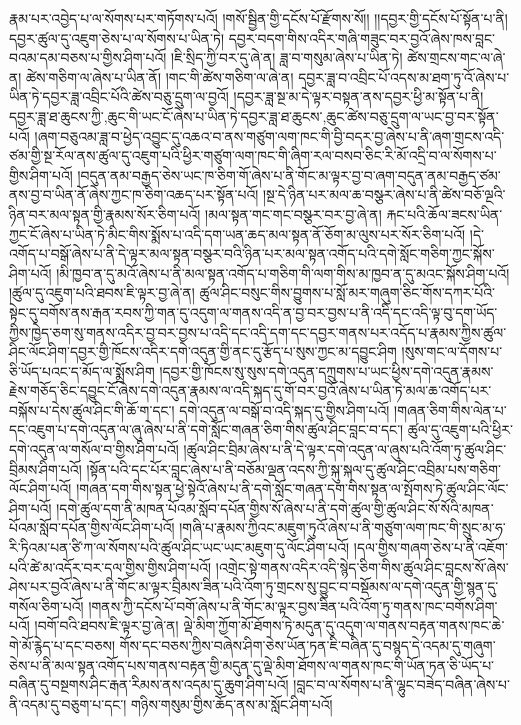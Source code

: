 རྣམ་པར་འབྱེད་པ་ལ་སོགས་པར་གཏོགས་པའོ། །གསོ་སྦྱིན་གྱི་དངོས་པོ་རྫོགས་སོ།། །།དབྱར་གྱི་དངོས་པོ་སྟོན་པ་ནི། དབྱར་ཚུལ་དུ་འཇུག་ཅེས་པ་ལ་སོགས་པ་ཡིན་ཏེ། དབྱར་བདག་གིས་འདིར་གཞི་གཟུང་བར་བྱའོ་ཞེས་ཁས་བླང་བའམ་དམ་བཅས་པ་གྱིས་ཤིག་པའོ། །ཇི་སྲིད་ཀྱི་བར་དུ་ཞེ་ན། ཟླ་བ་གསུམ་ཞེས་པ་ཡིན་ཏེ། ཚེས་གྲངས་གང་ལ་ཞེ་ན། ཚེས་གཅིག་ལ་ཞེས་པ་ཡིན་ནོ། །གང་གི་ཚེས་གཅིག་ལ་ཞེ་ན། དབྱར་ཟླ་བ་འབྲིང་པོ་འདས་མ་ཐག་ཏུ་འོ་ཞེས་པ་ཡིན་ཏེ་དབྱར་ཟླ་འབྲིང་པོའི་ཚེས་བཅུ་དྲུག་ལ་བྱའོ། །དབྱར་ཟླ་སྔ་མ་དེ་ལྟར་བསྟན་ནས་དབྱར་ཕྱི་མ་སྟོན་པ་ནི། དབྱར་ཟླ་ཐ་{ཆུངས་ཀྱི་,ཆུང་གི་}ཡང་ངོ་ཞེས་པ་ཡིན་ཏེ་དབྱར་ཟླ་ཐ་{ཆུངས་,ཆུང་}ཚེས་བཅུ་དྲུག་ལ་ཡང་བྱ་བར་སྟོན་པའོ། །ཞག་བཅུའམ་ཟླ་བ་ཕྱེད་འབྱུང་དུ་འཆའ་བ་ནས་གཙུག་ལག་ཁང་གི་བྱི་བདར་བྱ་ཞེས་པ་ནི་ཞག་གྲངས་འདི་ཙམ་གྱི་སྔ་རོལ་ནས་ཚུལ་དུ་འཇུག་པའི་ཕྱིར་གཙུག་ལག་ཁང་གི་ཞིག་རལ་བསབ་ཅིང་རི་མོ་འདྲི་བ་ལ་སོགས་པ་གྱིས་ཤིག་པའོ། །བདུན་ནམ་བརྒྱད་ཅེས་ཡང་ཁ་ཅིག་གོ་ཞེས་པ་ནི་གོང་མ་ལྟར་བྱ་བ་ཞག་བདུན་ནམ་བརྒྱད་ཙམ་ནས་བྱ་བ་ཡིན་ནོ་ཞེས་ཀྱང་ཁ་ཅིག་འཆད་པར་སྟོན་པའོ། །སྔ་དེ་ཉིན་པར་མལ་ཆ་བསྩར་ཞེས་པ་ནི་ཚེས་བཅོ་ལྔའི་ཉིན་བར་མལ་སྟན་གྱི་རྣམས་སོར་ཅིག་པའོ། །མལ་སྟན་གང་གང་བསྩར་བར་བྱ་ཞེ་ན། རྐང་པའི་ཆོལ་ཟངས་ཡིན་ཀྱང་ངོ་ཞེས་པ་ཡིན་ཏེ་མིང་གིས་སྨོས་པ་འདི་དག་ཡན་ཆད་མལ་སྟན་ནོ་ཅོག་མ་ལུས་པར་སོར་ཅིག་པའོ། །དེ་འགོད་པ་བསྒོ་ཞེས་པ་ནི་དེ་ལྟར་མལ་སྟན་བསྩར་བའི་ཉིན་པར་མལ་སྟན་འགོད་པའི་དགེ་སློང་གཅིག་ཀྱང་སྐོས་ཤིག་པའོ། །མི་ཁྱབ་ན་དུ་མའོ་ཞེས་པ་ནི་མལ་སྟན་འགོད་པ་གཅིག་གི་ལག་གིས་མ་ཁྱབ་ན་དུ་མའང་སྐོས་ཤིག་པའོ། །ཚུལ་དུ་འཇུག་པའི་ཐབས་ཇི་ལྟར་བྱ་ཞེ་ན། ཚུལ་ཤིང་བསུང་གིས་བྱུགས་པ་སློ་མར་གཞུག་ཅིང་གོས་དཀར་པོའི་སྟེང་དུ་བགོས་ནས་རྒན་རབས་ཀྱི་གན་དུ་འདུག་ལ་གནས་འདི་ན་བྱ་བར་བྱས་པ་ནི་འདི་དང་འདི་ལྟ་བུ་དག་ཡོད་ཀྱིས་ཁྱེད་ཅག་སུ་གནས་འདིར་བྱ་བར་བྱས་པ་འདི་དང་འདི་དག་དང་དབྱར་གནས་པར་འདོད་པ་རྣམས་ཀྱིས་ཚུལ་ཤིང་ལོང་ཤིག་དབྱར་གྱི་ཁོངས་འདིར་དགེ་འདུན་གྱི་ནང་དུ་རྩོད་པ་སུས་ཀྱང་མ་དབྱུང་ཤིག །སུས་གང་ལ་དོགས་པ་ཅི་ཡོད་པའང་ད་མོད་ལ་སྨྲོས་ཤིག །དབྱར་གྱི་ཁོངས་སུ་སུས་དགེ་འདུན་དཀྲུགས་པ་ཡང་ཕྱིས་དགེ་འདུན་རྣམས་རྗེས་གཅོད་ཅིང་དབྱུང་ངོ་ཞེས་དགེ་འདུན་རྣམས་ལ་འདི་སྐད་དུ་གོ་བར་བྱའོ་ཞེས་པ་ཡིན་ཏེ་མལ་ཆ་འགོད་པར་བསྐོས་པ་དེས་ཚུལ་ཤིང་གི་ཆོ་ག་དང་། དགེ་འདུན་ལ་བསྒོ་བ་འདི་སྐད་དུ་གྱིས་ཤིག་པའོ། །གཞན་ཅིག་གིས་ལེན་པ་དང་འཇུག་པ་དགེ་འདུན་ལ་ཞུ་ཞེས་པ་ནི་དགེ་སློང་གཞན་ཅིག་གིས་ཚུལ་ཤིང་བླང་བ་དང་། ཚུལ་དུ་འཇུག་པའི་ཕྱིར་དགེ་འདུན་ལ་གསོལ་བ་གྱིས་ཤིག་པའོ། །ཚུལ་ཤིང་བྲིམ་ཞེས་པ་ནི་དེ་ལྟར་དགེ་འདུན་ལ་ཞུས་པའི་འོག་ཏུ་ཚུལ་ཤིང་བྲིམས་ཤིག་པའོ། །སྟོན་པའི་དང་པོར་བླང་ཞེས་པ་ནི་བཅོམ་ལྡན་འདས་ཀྱི་སྐུ་སྐལ་དུ་ཚུལ་ཤིང་འབྲིམ་པས་གཅིག་ལོང་ཤིག་པའོ། །གཞན་དག་གིས་སྟན་ཕྱེ་སྟེའོ་ཞེས་པ་ནི་དགེ་སློང་གཞན་དག་གིས་སྟན་ལ་སྤོགས་ཏེ་ཚུལ་ཤིང་ལོང་ཤིག་པའོ། །དགེ་ཚུལ་དག་ནི་མཁན་པོའམ་སློབ་དཔོན་གྱིས་སོ་ཞེས་པ་ནི་དགེ་ཚུལ་གྱི་ཚུལ་ཤིང་སོ་སོའི་མཁན་པོའམ་སློབ་དཔོན་གྱིས་ལོང་ཤིག་པའོ། །གཞི་པ་རྣམས་ཀྱིའང་མཇུག་ཏུའོ་ཞེས་པ་ནི་གཙུག་ལག་ཁང་གི་སྲུང་མ་ཧ་རི་ཏིའམ་པན་ཙི་ཀ་ལ་སོགས་པའི་ཚུལ་ཤིང་ཡང་ཡང་མཇུག་དུ་ལོང་ཤིག་པའོ། །དལ་གྱིས་གཞག་ཅེས་པ་ནི་འཇོག་པའི་ཚེ་མ་འདོར་བར་དལ་གྱིས་གྱིས་ཤིག་པའོ། །འགྲེང་སྟེ་གནས་འདིར་འདི་སྙེད་ཅིག་གིས་ཚུལ་ཤིང་བླངས་སོ་ཞེས་ཤེས་པར་བྱའོ་ཞེས་པ་ནི་གོང་མ་ལྟར་བྲིམས་ཟིན་པའི་འོག་ཏུ་གྲངས་སུ་བྱུང་བ་བསྡོམས་ལ་དགེ་འདུན་གྱི་སྙན་དུ་གསོལ་ཅིག་པའོ། །གནས་ཀྱི་དངོས་པོ་བགོ་ཞེས་པ་ནི་གོང་མ་ལྟར་བྱས་ཟིན་པའི་འོག་ཏུ་གནས་ཁང་བགོས་ཤིག་པའོ། །བགོ་བའི་ཐབས་ཇི་ལྟར་བྱ་ཞེ་ན། ལྡེ་མིག་ཀྱོག་མོ་ཐོགས་ཏེ་མདུན་དུ་འདུག་ལ་གནས་བརྟན་གནས་ཁང་ཆེ་གེ་མོ་རྙེད་པ་དང་བཅས། གོས་དང་བཅས་ཀྱིས་བཞེས་ཤིག་ཅེས་ཡོན་ཏན་ཇི་བཞིན་དུ་བསྙད་དེ་འདམ་དུ་གཞུག་ཅེས་པ་ནི་མལ་སྟན་འགོད་པས་གནས་བརྟན་གྱི་མདུན་དུ་ལྡེ་མིག་ཐོགས་ལ་གནས་ཁང་གི་ཡོན་ཏན་ཅི་ཡོད་པ་བཞིན་དུ་བསྔགས་ཤིང་རྒན་རིམས་ནས་འདམ་དུ་ཆུག་ཤིག་པའོ། །བླང་བ་ལ་སོགས་པ་ནི་ལྷུང་བཟེད་བཞིན་ཞེས་པ་ནི་འདམ་དུ་བཅུག་པ་དང་། གཉིས་གསུམ་གྱིས་ཆོད་ནས་མ་སློང་ཤིག་པའོ། 